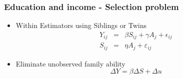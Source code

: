 \documentclass{beamer}
\newcommand{\1}{\mathbb{1}}
\begin{document}

\begin{frame}\frametitle{Education and income - Selection problem}
\begin{itemize}
\item Within Estimators using Siblings or Twins
\begin{eqnarray*}
Y_{ij} &=&  \beta S_{ij} + \gamma A_j + \epsilon_{ij}\\
S_{ij} &=& \eta A_j + \varepsilon_{ij}
\end{eqnarray*}
\item Eliminate unobserved family ability
\begin{equation*}
\Delta Y = \beta \Delta S + \Delta u
\end{equation*}
\end{itemize}
\end{frame}
\end{document}
